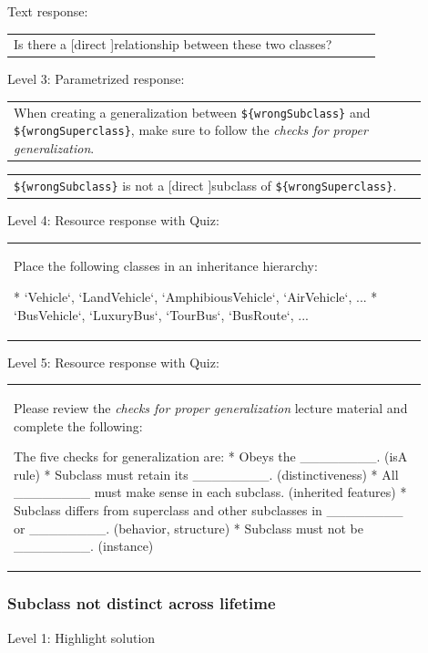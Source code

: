 Text response: \medskip

\begin{tabular}{|p{0.9\linewidth}}
Is there a [direct ]relationship between these two classes?
\end{tabular} \medskip

\noindent Level 3: Parametrized response: \medskip

\begin{tabular}{|p{0.9\linewidth}}
When creating a generalization between \verb|${wrongSubclass}| and \verb|${wrongSuperclass}|, make sure to follow the \textit{checks for proper generalization}.
\end{tabular} \medskip

\begin{tabular}{|p{0.9\linewidth}}
\verb|${wrongSubclass}| is not a [direct ]subclass of \verb|${wrongSuperclass}|.
\end{tabular} \medskip

\noindent Level 4: Resource response with Quiz: \medskip

\begin{tabular}{|p{0.9\linewidth}}
Place the following classes in an inheritance hierarchy:

* `Vehicle`, `LandVehicle`, `AmphibiousVehicle`, `AirVehicle`, ...
* `BusVehicle`, `LuxuryBus`, `TourBus`, `BusRoute`, ...
\end{tabular} \medskip

\noindent Level 5: Resource response with Quiz: \medskip

\begin{tabular}{|p{0.9\linewidth}}
Please review the \textit{checks for proper generalization} lecture material
and complete the following:

The five checks for generalization are:
* Obeys the ________. (isA rule)
* Subclass must retain its ________. (distinctiveness)
* All ________ must make sense in each subclass. (inherited features)
* Subclass differs from superclass and other subclasses in ________ or ________. 
(behavior, structure)
* Subclass must not be ________. (instance)
\end{tabular} \medskip


\subsubsection{Subclass not distinct across lifetime}

\noindent Level 1: Highlight solution \medskip

